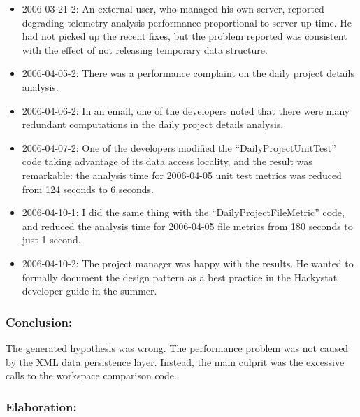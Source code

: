 \begin{itemize}
  \item 2006-03-21-2: An external user, who managed his own server, reported degrading telemetry analysis performance proportional to server up-time. He had not picked up the recent fixes, but the problem reported was consistent with the effect of not releasing temporary data structure. 
  \item 2006-04-05-2: There was a performance complaint on the daily project details analysis.
  \item 2006-04-06-2: In an email, one of the developers noted that there were many redundant computations in the daily project details analysis.
  \item 2006-04-07-2: One of the developers modified the ``DailyProjectUnitTest'' code taking advantage of its data access locality, and the result was remarkable: the analysis time for 2006-04-05 unit test metrics was reduced from 124 seconds to 6 seconds.
  \item 2006-04-10-1: I did the same thing with the ``DailyProjectFileMetric'' code, and reduced the analysis time for 2006-04-05 file metrics from 180 seconds to just 1 second.
  \item 2006-04-10-2: The project manager was happy with the results. He wanted to formally document the design pattern as a best practice in the Hackystat developer guide in the summer.
\end{itemize}

\subsubsection{Conclusion:}

The generated hypothesis was wrong. The performance problem was not caused by the XML data persistence layer. Instead, the main culprit was the excessive calls to the workspace comparison code.

\subsubsection{Elaboration:}

